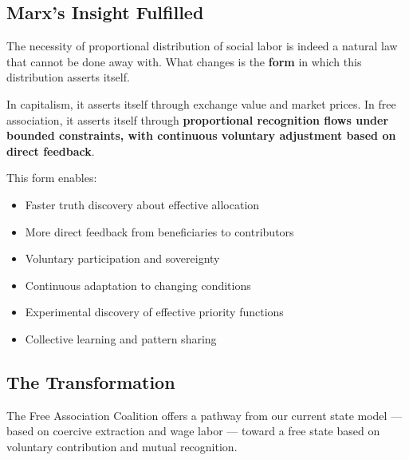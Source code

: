 \documentclass[11pt]{article}
\begin{document}
\subsection{Marx's Insight Fulfilled}

The necessity of proportional distribution of social labor is indeed a natural law that cannot be done away with. What changes is the \textbf{form} in which this distribution asserts itself.

In capitalism, it asserts itself through exchange value and market prices. In free association, it asserts itself through \textbf{proportional recognition flows under bounded constraints, with continuous voluntary adjustment based on direct feedback}.

This form enables:
\begin{itemize}
\item Faster truth discovery about effective allocation
\item More direct feedback from beneficiaries to contributors
\item Voluntary participation and sovereignty
\item Continuous adaptation to changing conditions
\item Experimental discovery of effective priority functions
\item Collective learning and pattern sharing
\end{itemize}

\subsection{The Transformation}

The Free Association Coalition offers a pathway from our current state model — based on coercive extraction and wage labor — toward a free state based on voluntary contribution and mutual recognition.
\end{document}
